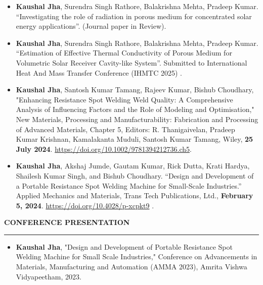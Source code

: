 \documentclass[letterpaper,10pt]{article}
\newcommand{\sectionline}[1]{%
    \vspace{0.7em}%
    \textbf{\large #1} \vspace{-2.0em}\\%
    
    \rule{\textwidth}{0.5pt}%
    \vspace{0.25em}%
}
\begin{document}
\begin{itemize}
    \item \textbf{Kaushal Jha}, Surendra Singh Rathore, Balakrishna Mehta, Pradeep Kumar. “Investigating the role of radiation in porous medium for concentrated solar energy applications”. (Journal paper in Review).\\

    \item \textbf{Kaushal Jha}, Surendra Singh Rathore, Balakrishna Mehta, Pradeep Kumar. “Estimation of Effective Thermal Conductivity of Porous Medium
for Volumetric Solar Receiver Cavity-like System”. Submitted to International Heat And Mass Transfer Conference (IHMTC 2025) .\\

    \item \textbf{Kaushal Jha}, Santosh Kumar Tamang, Rajeev Kumar, Bishub Choudhary, "Enhancing Resistance Spot Welding Weld Quality: A Comprehensive Analysis of Influencing Factors and the Role of Modeling and Optimisation," New Materials, Processing and Manufacturability: Fabrication and Processing of Advanced Materials, Chapter 5, Editors: R. Thanigaivelan, Pradeep Kumar Krishnan, Kamalakanta Muduli, Santosh Kumar Tamang, Wiley, \textbf{25 July 2024}. \href{https://doi.org/10.1002/9781394212736.ch5}{https://doi.org/10.1002/9781394212736.ch5}.\\
    \item \textbf{Kaushal Jha}, Akshaj Jumde, Gautam Kumar, Rick Dutta, Krati Hardya, Shailesh Kumar Singh, and Bishub Choudhary. “Design and Development of a Portable Resistance Spot Welding Machine for Small-Scale Industries.” Applied Mechanics and Materials, Trans Tech Publications, Ltd., \textbf{February 5, 2024}. \href{https://doi.org/10.4028/p-xcpkt9}{https://doi.org/10.4028/p-xcpkt9} .

\end{itemize}





\sectionline{CONFERENCE PRESENTATION}
\begin{itemize}
    \item \textbf{Kaushal Jha}, "Design and Development of Portable Resistance Spot Welding Machine for Small Scale Industries," Conference on Advancements in Materials, Manufacturing and Automation (AMMA 2023), Amrita Vishwa Vidyapeetham, 2023.
    
\end{itemize}
\end{document}
